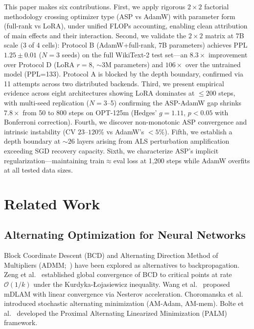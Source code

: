 \documentclass[11pt]{article}
\begin{document}
This paper makes six contributions. First, we apply rigorous $2\times2$ factorial methodology crossing optimizer type (ASP vs AdamW) with parameter form (full-rank vs LoRA), under unified FLOPs accounting, enabling clean attribution of main effects and their interaction. Second, we validate the $2\times2$ matrix at 7B scale (3 of 4 cells): Protocol B (AdamW+full-rank, 7B parameters) achieves PPL $1.25 \pm 0.01$ ($N=3$ seeds) on the full WikiText-2 test set---an $8.3\times$ improvement over Protocol D (LoRA $r=8$, $\sim$3M parameters) and $106\times$ over the untrained model (PPL=133). Protocol A is blocked by the depth boundary, confirmed via 11 attempts across two distributed backends. Third, we present empirical evidence across eight architectures showing LoRA dominates at $\leq 200$ steps, with multi-seed replication ($N=3$--5) confirming the ASP-AdamW gap shrinks $7.8\times$ from 50 to 800 steps on OPT-125m (Hedges' $g=1.11$, $p<0.05$ with Bonferroni correction). Fourth, we discover non-monotonic ASP convergence and intrinsic instability (CV $23$--$120\%$ vs AdamW's $<5\%$). Fifth, we establish a depth boundary at $\sim26$ layers arising from ALS perturbation amplification exceeding SGD recovery capacity. Sixth, we characterize ASP's implicit regularization---maintaining train$\approx$eval loss at 1,200 steps while AdamW overfits at all tested data sizes.

\section{Related Work}

\subsection{Alternating Optimization for Neural Networks}

Block Coordinate Descent (BCD) and Alternating Direction Method of Multipliers (ADMM;~\cite{boyd2011distributed}) have been explored as alternatives to backpropagation. Zeng et al.~\cite{zeng2019global} established global convergence of BCD to critical points at rate $\mathcal{O}(1/k)$ under the Kurdyka-Łojasiewicz inequality. Wang et al.~\cite{wang2018accelerated} proposed mDLAM with linear convergence via Nesterov acceleration. Choromanska et al.~\cite{choromanska2019beyond} introduced stochastic alternating minimization (AM-Adam, AM-mem). Bolte et al.~\cite{bolte2014proximal} developed the Proximal Alternating Linearized Minimization (PALM) framework.
\end{document}
